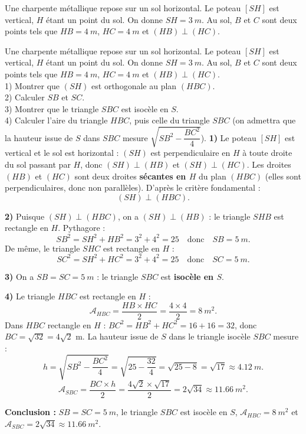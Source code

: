 \documentclass[11pt]{article}
\begin{document}
\begin{exemplebox}
Une charpente métallique repose sur un sol horizontal. Le poteau $[SH]$ est vertical, $H$ étant un point du sol. On donne $SH = \SI{3}{m}$. Au sol, $B$ et $C$ sont deux points tels que $HB = \SI{4}{m}$, $HC = \SI{4}{m}$ et $(HB) \perp (HC)$.
\end{exemplebox}

\begin{exoresolu}
Une charpente métallique repose sur un sol horizontal. Le poteau $[SH]$ est vertical, $H$ étant un point du sol. On donne $SH = \SI{3}{m}$. Au sol, $B$ et $C$ sont deux points tels que $HB = \SI{4}{m}$, $HC = \SI{4}{m}$ et $(HB) \perp (HC)$.\\
1) Montrer que $(SH)$ est orthogonale au plan $(HBC)$.\\
2) Calculer $SB$ et $SC$.\\
3) Montrer que le triangle $SBC$ est isocèle en $S$.\\
4) Calculer l'aire du triangle $HBC$, puis celle du triangle $SBC$ (on admettra que la hauteur issue de $S$ dans $SBC$ mesure $\sqrt{SB^2 - \dfrac{BC^2}{4}}$).
\tcblower
\textbf{1)} Le poteau $[SH]$ est vertical et le sol est horizontal : $(SH)$ est perpendiculaire en $H$ à toute droite du sol passant par $H$, donc $(SH) \perp (HB)$ et $(SH) \perp (HC)$. Les droites $(HB)$ et $(HC)$ sont deux droites \textbf{sécantes en $H$} du plan $(HBC)$ (elles sont perpendiculaires, donc non parallèles). D'après le critère fondamental :
\[ (SH) \perp (HBC). \]

\textbf{2)} Puisque $(SH) \perp (HBC)$, on a $(SH) \perp (HB)$ : le triangle $SHB$ est rectangle en $H$. Pythagore :
\[ SB^2 = SH^2 + HB^2 = 3^2 + 4^2 = 25 \quad \text{donc} \quad SB = \SI{5}{m}. \]
De même, le triangle $SHC$ est rectangle en $H$ :
\[ SC^2 = SH^2 + HC^2 = 3^2 + 4^2 = 25 \quad \text{donc} \quad SC = \SI{5}{m}. \]

\textbf{3)} On a $SB = SC = \SI{5}{m}$ : le triangle $SBC$ est \textbf{isocèle en $S$}.

\textbf{4)} Le triangle $HBC$ est rectangle en $H$ :
\[ \mathcal{A}_{HBC} = \dfrac{HB \times HC}{2} = \dfrac{4 \times 4}{2} = \SI{8}{m^2}. \]
Dans $HBC$ rectangle en $H$ : $BC^2 = HB^2 + HC^2 = 16 + 16 = 32$, donc $BC = \sqrt{32} = 4\sqrt{2}$ m. La hauteur issue de $S$ dans le triangle isocèle $SBC$ mesure :
\[ h = \sqrt{SB^2 - \dfrac{BC^2}{4}} = \sqrt{25 - \dfrac{32}{4}} = \sqrt{25 - 8} = \sqrt{17} \approx \SI{4,12}{m}. \]
\[ \mathcal{A}_{SBC} = \dfrac{BC \times h}{2} = \dfrac{4\sqrt{2} \times \sqrt{17}}{2} = 2\sqrt{34} \approx \SI{11,66}{m^2}. \]

\textbf{Conclusion :} $SB = SC = \SI{5}{m}$, le triangle $SBC$ est isocèle en $S$, $\mathcal{A}_{HBC} = \SI{8}{m^2}$ et $\mathcal{A}_{SBC} = 2\sqrt{34} \approx \SI{11,66}{m^2}$.
\end{exoresolu}
\end{document}

